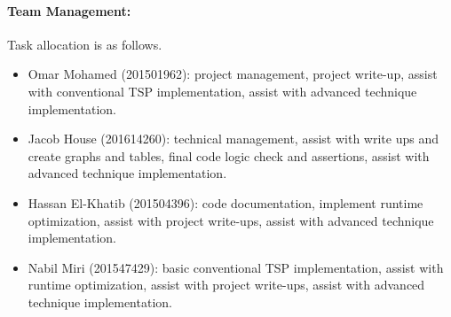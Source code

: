 	\paragraph{Team Management:} Task allocation is as follows.
	\begin{itemize}
		\item Omar Mohamed (201501962): project management, project write-up, assist with conventional TSP implementation, assist with advanced technique implementation.
		\item Jacob House (201614260): technical management, assist with write ups and create graphs and tables, final code logic check and assertions, assist with advanced technique implementation.
		\item Hassan El-Khatib (201504396): code documentation, implement runtime optimization, assist with project write-ups, assist with advanced technique implementation.
		\item Nabil Miri (201547429): basic conventional TSP implementation, assist with runtime optimization, assist with project write-ups, assist with advanced technique implementation.
	\end{itemize}
	
	\nocite{*}
	\printbibliography

